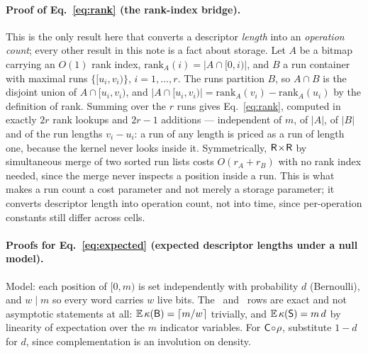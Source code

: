 \paragraph*{Proof of Eq.~\eqref{eq:rank} (the rank-index bridge).}
This is the only result here that converts a descriptor \emph{length} into an \emph{operation count};
every other result in this note is a fact about storage. Let $A$ be a bitmap carrying an $O(1)$ rank
index, $\mathrm{rank}_A(i)=|A\cap[0,i)|$, and $B$ a run container with maximal runs $\{[u_i,v_i)\}$,
$i=1,\dots,r$. The runs partition $B$, so $A\cap B$ is the disjoint union of $A\cap[u_i,v_i)$, and
$|A\cap[u_i,v_i)|=\mathrm{rank}_A(v_i)-\mathrm{rank}_A(u_i)$ by the definition of rank. Summing over
the $r$ runs gives Eq.~\eqref{eq:rank}, computed in exactly $2r$ rank lookups and $2r-1$ additions ---
independent of $m$, of $|A|$, of $|B|$ and of the run lengths $v_i-u_i$: a run of any length is priced
as a run of length one, because the kernel never looks inside it. Symmetrically, $\textsf{R}\!\times\!\textsf{R}$ by
simultaneous merge of two sorted run lists costs $O(r_A+r_B)$ with no rank index needed, since the
merge never inspects a position inside a run. This is what makes a run count a cost parameter and not
merely a storage parameter; it converts descriptor length into operation count, not into time, since
per-operation constants still differ across cells.

\paragraph*{Proofs for Eq.~\eqref{eq:expected} (expected descriptor lengths under a null model).}
Model: each position of $[0,m)$ is set independently with probability $d$ (Bernoulli), and $w\mid m$
so every word carries $w$ live bits. The \rB\ and \rS\ rows are exact and not asymptotic statements at
all: $\mathbb{E}\,\kappa(\textsf{B})=\lceil m/w\rceil$ trivially, and $\mathbb{E}\,\kappa(\textsf{S})=m\,d$ by
linearity of expectation over the $m$ indicator variables. For $\textsf{C}\!\circ\!\rho$, substitute $1-d$ for
$d$, since complementation is an involution on density.

